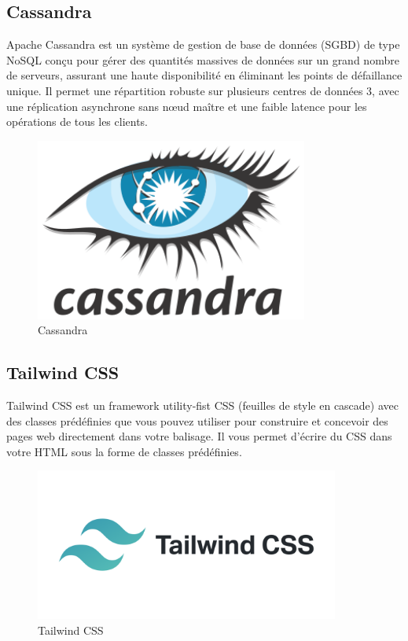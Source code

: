 \subsection{Cassandra}

Apache Cassandra est un système de gestion de base de données (SGBD) de type NoSQL conçu pour gérer des quantités massives de données sur un grand nombre de serveurs, assurant une haute disponibilité en éliminant les points de défaillance unique. Il permet une répartition robuste sur plusieurs centres de données 3, avec une réplication asynchrone sans nœud maître et une faible latence pour les opérations de tous les clients.

\begin{figure}[!h]
\begin{center}
\includegraphics[height=6cm]{Cassandra.svg.png}
\end{center}
\caption{Cassandra}
\end{figure}


\subsection{Tailwind CSS}

Tailwind CSS est un framework utility-fist CSS (feuilles de style en cascade) avec des classes prédéfinies que vous pouvez utiliser pour construire et concevoir des pages web directement dans votre balisage. Il vous permet d’écrire du CSS dans votre HTML sous la forme de classes prédéfinies.

\begin{figure}[!h]
\begin{center}
\includegraphics[height=5cm]{tailwindcss.png}
\end{center}
\caption{Tailwind CSS}
\end{figure}





